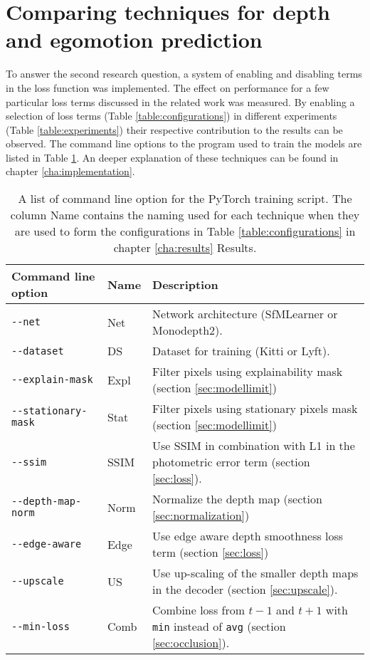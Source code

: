 
\section{Comparing techniques for depth and egomotion prediction}

To answer the second research question, a system of enabling and disabling terms in the loss function was implemented. The effect on performance for a few particular loss terms discussed in the related work was measured. By enabling a selection of loss terms (Table \ref{table:configurations}) in different experiments (Table \ref{table:experiments})  their respective contribution to the results can be observed. The command line options to the program used to train the models are listed in Table \ref{table:cli}. An deeper explanation of these techniques can be found in chapter \ref{cha:implementation}.

\begin{table}[H]
	\centering
	\begin{tabular}{ |l|l|p{65mm}| }
		\hline
		Command line option & Name & Description \\
		\hline
		\texttt{-{}-net} & Net & Network architecture (SfMLearner or Monodepth2). \\
		\hline
		\texttt{-{}-dataset} & DS & Dataset for training (Kitti or Lyft). \\
		\hline
		\texttt{-{}-explain-mask} & Expl & Filter pixels using explainability mask (section \ref{sec:modellimit}) \\
		\hline
		\texttt{-{}-stationary-mask} & Stat & Filter pixels using stationary pixels mask (section \ref{sec:modellimit}) \\
		\hline
		\texttt{-{}-ssim} & SSIM & Use SSIM in combination with L1 in the photometric error term (section \ref{sec:loss}). \\
		\hline
		\texttt{-{}-depth-map-norm} & Norm & Normalize the depth map (section \ref{sec:normalization}) \\
		\hline
		\texttt{-{}-edge-aware} & Edge & Use edge aware depth smoothness loss term (section \ref{sec:loss}) \\
		\hline
		\texttt{-{}-upscale} & US & Use up-scaling of the smaller depth maps in the decoder (section \ref{sec:upscale}). \\
		\hline
		\texttt{-{}-min-loss} & Comb & Combine loss from $t-1$ and $t+1$ with \texttt{min} instead of \texttt{avg} (section \ref{sec:occlusion}). \\
		\hline
	\end{tabular}
	\caption{A list of command line option for the PyTorch training script. The column Name contains the naming used for each technique when they are used to form the configurations in Table \ref{table:configurations} in chapter \ref{cha:results} Results.}
	\label{table:cli}
\end{table}